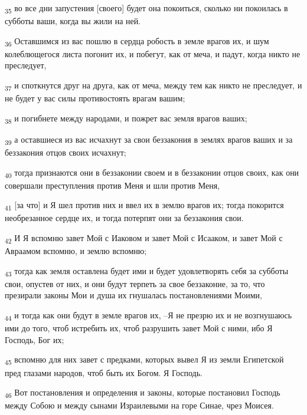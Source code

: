 \begin{tcolorbox}
\textsubscript{35} во все дни запустения [своего] будет она покоиться, сколько ни покоилась в субботы ваши, когда вы жили на ней.
\end{tcolorbox}
\begin{tcolorbox}
\textsubscript{36} Оставшимся из вас пошлю в сердца робость в земле врагов их, и шум колеблющегося листа погонит их, и побегут, как от меча, и падут, когда никто не преследует,
\end{tcolorbox}
\begin{tcolorbox}
\textsubscript{37} и споткнутся друг на друга, как от меча, между тем как никто не преследует, и не будет у вас силы противостоять врагам вашим;
\end{tcolorbox}
\begin{tcolorbox}
\textsubscript{38} и погибнете между народами, и пожрет вас земля врагов ваших;
\end{tcolorbox}
\begin{tcolorbox}
\textsubscript{39} а оставшиеся из вас исчахнут за свои беззакония в землях врагов ваших и за беззакония отцов своих исчахнут;
\end{tcolorbox}
\begin{tcolorbox}
\textsubscript{40} тогда признаются они в беззаконии своем и в беззаконии отцов своих, как они совершали преступления против Меня и шли против Меня,
\end{tcolorbox}
\begin{tcolorbox}
\textsubscript{41} [за что] и Я шел против них и ввел их в землю врагов их; тогда покорится необрезанное сердце их, и тогда потерпят они за беззакония свои.
\end{tcolorbox}
\begin{tcolorbox}
\textsubscript{42} И Я вспомню завет Мой с Иаковом и завет Мой с Исааком, и завет Мой с Авраамом вспомню, и землю вспомню;
\end{tcolorbox}
\begin{tcolorbox}
\textsubscript{43} тогда как земля оставлена будет ими и будет удовлетворять себя за субботы свои, опустев от них, и они будут терпеть за свое беззаконие, за то, что презирали законы Мои и душа их гнушалась постановлениями Моими,
\end{tcolorbox}
\begin{tcolorbox}
\textsubscript{44} и тогда как они будут в земле врагов их, --Я не презрю их и не возгнушаюсь ими до того, чтоб истребить их, чтоб разрушить завет Мой с ними, ибо Я Господь, Бог их;
\end{tcolorbox}
\begin{tcolorbox}
\textsubscript{45} вспомню для них завет с предками, которых вывел Я из земли Египетской пред глазами народов, чтоб быть их Богом. Я Господь.
\end{tcolorbox}
\begin{tcolorbox}
\textsubscript{46} Вот постановления и определения и законы, которые постановил Господь между Собою и между сынами Израилевыми на горе Синае, чрез Моисея.
\end{tcolorbox}
